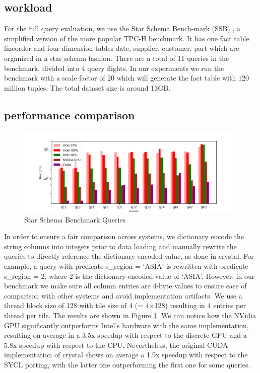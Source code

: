 \documentclass[sigconf, nonacm]{acmart}
\begin{document}
\subsection{workload}
For the full query evaluation, we use the Star Schema Bench-mark (SSB) \cite{ssb}, a simplified version of the more popular TPC-H benchmark. It has one fact table lineorder and four dimension tables date, supplier, customer, part which are organized in a star schema fashion.
There are a total of 11 queries in the benchmark, divided into 4 query flights. 
In our experiments we run the benchmark with a scale factor of 20 which will generate the fact table with 120 million tuples. The total dataset size is around 13GB.


\subsection{performance comparison}

\begin{figure}
    \includegraphics[height=.33\textheight, width=1\linewidth]{figures/queries.png}
    \caption{Star Schema Benchmark Queries}
    \label{fig:ssb}
\end{figure}
In order to ensure a fair comparison across systems, we dictionary encode the string columns into integers prior to data loading and manually rewrite the queries to directly reference the dictionary-encoded value, as done in crystal. 
For example, a query with predicate s\_region = ‘ASIA’ is rewritten with predicate s\_region = 2, where 2 is the dictionary-encoded value
of ‘ASIA’. 
However, in our benchmark we make sure all column entries
are 4-byte values to ensure ease of comparison with other
systems and avoid implementation artifacts. 
We use a thread block size of 128 with tile size
of 4 (= 4×128) resulting in 4 entries per thread per tile.
The results are shown in Figure \ref{fig:ssb}. 
We can notice how the NVidia GPU significantly outperforms Intel's hardware with the same implementation, resulting on average in a 3.5x speedup with respect to the discrete GPU and a 5.8x speedup with respect to the CPU. 
Nevertheless, the original CUDA implementation of crystal shows on average a 1.9x speedup with respect to the SYCL porting, with the latter one outperforming the first one for some queries. 
\end{document}

